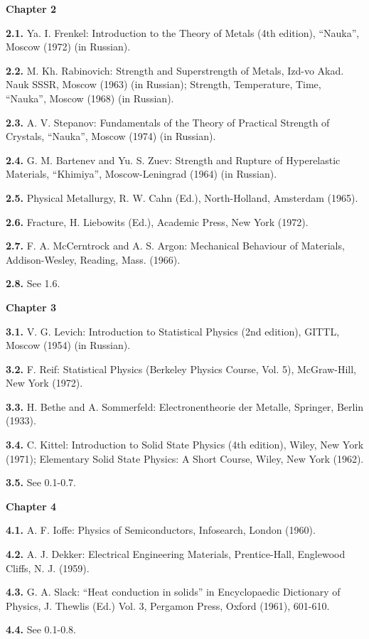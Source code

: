 \bigskip

{\large{\sffamily\bfseries Chapter 2}}

{\small

\textbf{2.1.} Ya. I. Frenkel: Introduction to the Theory of Metals (4th edition), ``Nauka'', Moscow (1972) (in Russian).

\textbf{2.2.} M. Kh. Rabinovich: Strength and Superstrength of Metals, Izd-vo Akad. Nauk SSSR, Moscow (1963) (in Russian); Strength, Temperature, Time, ``Nauka'', Moscow (1968) (in Russian).

\textbf{2.3.} A. V. Stepanov: Fundamentals of the Theory of Practical Strength of Crystals, ``Nauka'', Moscow (1974) (in Russian).

\textbf{2.4.} G. M. Bartenev and Yu. S. Zuev: Strength and Rupture of Hyperelastic Materials, ``Khimiya'', Moscow-Leningrad (1964) (in Russian).

\textbf{2.5.} Physical Metallurgy, R. W. Cahn (Ed.), North-Holland, Amsterdam (1965).

\textbf{2.6.} Fracture, H. Liebowits (Ed.), Academic Press, New York (1972).

\textbf{2.7.} F. A. McCerntrock and A. S. Argon: Mechanical Behaviour of Materials, Addison-Wesley, Reading, Mass. (1966).

\textbf{2.8.} See 1.6.

}

\bigskip

{\large{\sffamily\bfseries Chapter 3}}

{\small

\textbf{3.1.} V. G. Levich: Introduction to Statistical Physics (2nd edition), GITTL, Moscow (1954) (in Russian).

\textbf{3.2.} F. Reif: Statistical Physics (Berkeley Physics Course, Vol. 5), McGraw-Hill, New York (1972).

\textbf{3.3.} H. Bethe and A. Sommerfeld: Electronentheorie der Metalle, Springer, Berlin (1933).

\textbf{3.4.} C. Kittel: Introduction to Solid State Physics (4th edition), Wiley, New York (1971); Elementary Solid State Physics: A Short Course, Wiley, New York (1962).

\textbf{3.5.} See 0.1-0.7.

}

\bigskip

{\large{\sffamily\bfseries Chapter 4}}

{\small

\textbf{4.1.} A. F. Ioffe: Physics of Semiconductors, Infosearch, London (1960).

\textbf{4.2.} A. J. Dekker: Electrical Engineering Materials, Prentice-Hall, Englewood Cliffs, N. J. (1959).

\textbf{4.3.} G. A. Slack: ``Heat conduction in solids'' in Encyclopaedic Dictionary of Physics, J. Thewlis (Ed.) Vol. 3, Pergamon Press, Oxford (1961), 601-610.

\textbf{4.4.} See 0.1-0.8.

}


